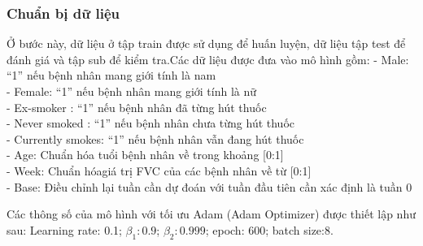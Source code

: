 \subsubsection{Chuẩn bị dữ liệu}
Ở bước này, dữ liệu ở tập train được sử dụng để huấn luyện, dữ liệu tập test để đánh giá và tập sub để kiểm tra.Các dữ liệu được đưa vào mô hình gồm:
\tab - Male: “1” nếu bệnh nhân mang giới tính là nam\\
\tab - Female: “1” nếu bệnh nhân mang giới tính là nữ\\
\tab - Ex-smoker : “1” nếu bệnh nhân đã từng hút thuốc\\
\tab - Never smoked : “1” nếu bệnh nhân chưa từng hút thuốc\\
\tab - Currently smokes: “1” nếu bệnh nhân vẫn đang hút thuốc\\
\tab - Age: Chuẩn hóa tuổi bệnh nhân về trong khoảng [0:1]\\
\tab - Week: Chuẩn hóagiá trị FVC của các bệnh nhân về từ [0:1]\\
\tab - Base: Điều chỉnh lại tuần cần dự đoán với tuần đầu tiên cần xác định là tuần 0\par
Các thông số của mô hình với tối ưu Adam (Adam Optimizer)  được thiết lập như sau:	Learning rate: 0.1; $\beta_1:0.9$; $\beta_2: 0.999$; epoch: 600; batch size:8.\par
